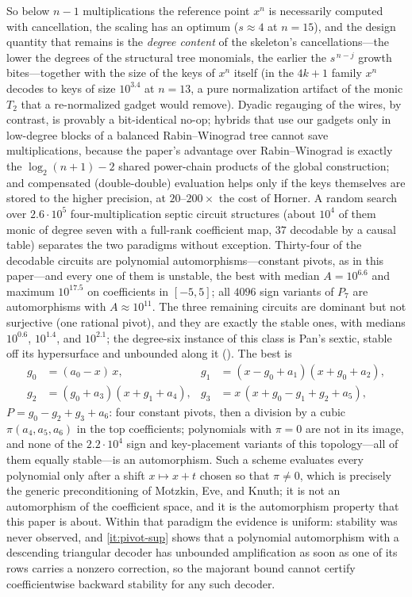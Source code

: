 So below $n-1$ multiplications the reference point $x^n$ is necessarily
computed with cancellation, the scaling has an optimum ($s\approx4$ at
$n=15$), and the design quantity that remains is the \emph{degree content} of
the skeleton's cancellations---the lower the degrees of the structural tree
monomials, the earlier the $s^{\,n-j}$ growth bites---together with the size
of the keys of $x^n$ itself (in the $4k+1$ family $x^n$ decodes to keys of size
$10^{3.4}$ at $n=13$, a pure normalization artifact of the monic $T_2$ that a
re-normalized gadget would remove).  Dyadic regauging of the wires, by
contrast, is provably a bit-identical no-op; hybrids that use our gadgets only in
low-degree blocks of a balanced Rabin--Winograd tree cannot save
multiplications, because the paper's advantage over Rabin--Winograd is exactly
the $\log_2(n+1)-2$ shared power-chain products of the global construction;
and compensated (double-double) evaluation helps only if the keys themselves
are stored to the higher precision, at $20$--$200\times$ the cost of Horner.
A random search over $2.6\cdot10^5$ four-multiplication septic circuit
structures (about $10^4$ of them monic of degree seven with a full-rank
coefficient map, $37$ decodable by a causal table) separates the two paradigms
without exception.  Thirty-four of the decodable circuits are polynomial
automorphisms---constant pivots, as in this paper---and every one of them is
unstable, the best with median $A=10^{6.6}$ and maximum $10^{17.5}$ on
coefficients in $[-5,5]$; all $4096$ sign variants of $P_7$ are automorphisms
with $A\approx10^{11}$.  The three remaining circuits are dominant but not
surjective (one rational pivot), and they are exactly the stable ones, with
medians $10^{0.6}$, $10^{1.4}$, and $10^{2.1}$; the degree-six instance of
this class is Pan's sextic, stable off its hypersurface and unbounded along
it ().  The best is
\begin{align}
  g_0&=(a_0-x)\,x, & g_1&=(x-g_0+a_1)(x+g_0+a_2),\\
  g_2&=(g_0+a_3)(x+g_1+a_4), & g_3&=x\,(x+g_0-g_1+g_2+a_5),
\end{align}
$P=g_0-g_2+g_3+a_6$: four constant pivots, then a division by a cubic
$\pi(a_4,a_5,a_6)$ in the top coefficients; polynomials with $\pi=0$ are not
in its image, and none of the $2.2\cdot10^4$ sign and key-placement variants
of this topology---all of them equally stable---is an automorphism.  Such a
scheme evaluates every polynomial only after a shift $x\mapsto x+t$ chosen so
that $\pi\ne0$, which is precisely the generic preconditioning of Motzkin,
Eve, and Knuth; it is not an automorphism of the coefficient space, and it is
the automorphism property that this paper is about.  Within that paradigm the
evidence is uniform: stability was never observed, and
\ref{it:pivot-sup} shows that a polynomial
automorphism with a descending triangular decoder has unbounded
amplification as soon as one of its rows carries a nonzero correction, so
the majorant bound cannot certify coefficientwise backward stability for
any such decoder.

